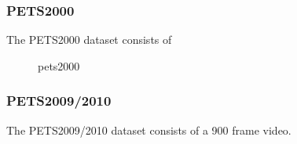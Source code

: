 \documentclass[smallcondensed, final]{svjour3}
\begin{document}
\subsubsection{PETS2000}

The PETS2000 dataset consists of

\begin{figure}
	\centering
	\caption{pets2000}
	\label{fig:pets2000_results}
\end{figure}




\subsubsection{PETS2009/2010}

The PETS2009/2010 dataset consists of a 900 frame video.
\end{document}
